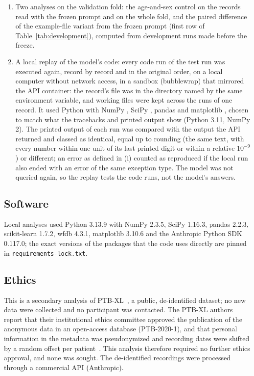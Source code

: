 \begin{enumerate}
  records whose summary was not empty.
  \item Two analyses on the validation fold: the age-and-sex control on the \NDevVTwoAll{} records read with the frozen
  prompt and on the whole fold, and the paired difference of the example-file variant from the frozen prompt (first
  row of Table~\ref{tab:development}), computed from development runs made before the freeze.
  \item A local replay of the model's code: every code run of the test run was executed again, record by record and
  in the original order, on a local computer without network access, in a sandbox (bubblewrap) that mirrored the API
  container: the record's file was in the directory named by the same environment variable, and working files were
  kept across the runs of one record. It used Python \RPPython{} with NumPy \RPNumPy, SciPy \RPSciPy, pandas
  \RPPandas{} and matplotlib \RPMatplotlib, chosen to match what the tracebacks and printed output show (Python 3.11,
  NumPy 2). The printed output of each run was compared with the output the API returned and classed as identical,
  equal up to rounding (the same text, with every number within one unit of its last printed digit or within a
  relative $10^{-9}$) or different; an error as defined in (i) counted as reproduced if the local run also ended with
  an error of the same exception type. The model was not queried again, so the replay tests the code runs, not the
  model's answers.
\end{enumerate}

\subsection{Software}
Local analyses used Python 3.13.9 with NumPy 2.3.5, SciPy 1.16.3, pandas 2.2.3, scikit-learn 1.7.2, wfdb 4.3.1,
matplotlib 3.10.6 and the Anthropic Python SDK 0.117.0; the exact versions of the packages that the code uses directly
are pinned in \texttt{requirements-lock.txt}.

\subsection{Ethics}
This is a secondary analysis of PTB-XL~\citep{Wagner2020,Wagner2022physionet}, a public, de-identified dataset; no new
data were collected and no participant was contacted. The PTB-XL authors report that their institutional ethics
committee approved the publication of the anonymous data in an open-access database (PTB-2020-1), and that personal
information in the metadata was pseudonymized and recording dates were shifted by a random offset per
patient~\citep{Wagner2020,Wagner2022physionet}. This analysis therefore required no further ethics approval, and none
was sought. The de-identified recordings were processed through a commercial API (Anthropic).
